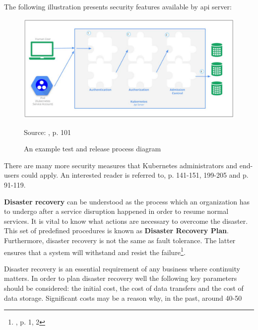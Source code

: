\begin{itemize}
The following illustration presents security features available by api server:
\begin{figure}[H]
    \centering
    \includegraphics[width=13cm]{figures/security-api-server.png}
    \label{fig:security-api-server}
    \caption{An example test and release process diagram}
    \small{Source: \cite{book-mastering-k8s}, p. 101}
\end{figure}

There are many more security measures that Kubernetes administrators and end-users could apply. An interested reader is referred to\cite{book-cndwk}, p. 141-151, 199-205 and \cite{book-mastering-k8s} p. 91-119.

\textbf{Disaster recovery} can be understood as the process which an organization has to undergo after a service  disruption happened in order to resume normal services. It is vital to know what actions are necessary to overcome the disaster. This set of predefined procedures is known as \textbf{Disaster Recovery Plan}. Furthermore, disaster recovery is not the same as fault tolerance. The latter ensures that a system will withstand and resist the failure\footnote{\cite{article-dr}, p. 1, 2}.

Disaster recovery is an essential requirement of any business where continuity matters. In order to plan disaster recovery well the following key parameters should be considered: the initial cost, the cost of data transfers and the cost of data storage. Significant costs may be a reason why, in the past, around 40-50%


\end{itemize}

